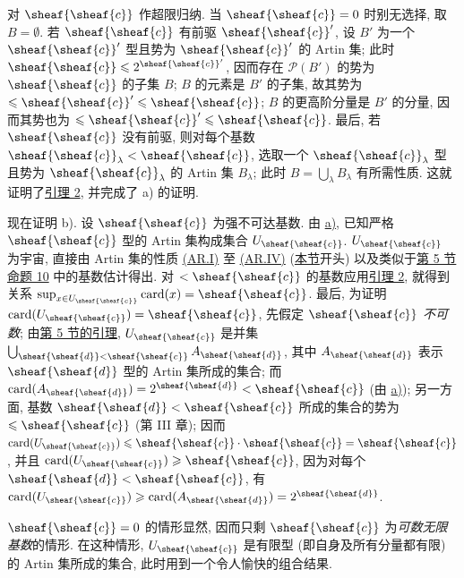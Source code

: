 对 $\sheaf{\sheaf{c}}$ 作超限归纳. 当 $\sheaf{\sheaf{c}}=0$ 时别无选择, 取 $B=∅$. 若 $\sheaf{\sheaf{c}}$ 有前驱 $\sheaf{\sheaf{c}}'$, 设 $B'$ 为一个 $\sheaf{\sheaf{c}}'$ 型且势为 $\sheaf{\sheaf{c}}'$ 的 Artin 集; 此时 $\sheaf{\sheaf{c}}\leq2^{\sheaf{\sheaf{c}}'}$, 因而存在 $\mathcal{P}(B')$ 的势为 $\sheaf{\sheaf{c}}$ 的子集 $B$; $B$ 的元素是 $B'$ 的子集, 故其势为 $\leq\sheaf{\sheaf{c}}'\leq\sheaf{\sheaf{c}}$; $B$ 的更高阶分量是 $B'$ 的分量, 因而其势也为 $\leq\sheaf{\sheaf{c}}'\leq\sheaf{\sheaf{c}}$. 最后, 若 $\sheaf{\sheaf{c}}$ 没有前驱, 则对每个基数 $\sheaf{\sheaf{c}}_\lambda<\sheaf{\sheaf{c}}$, 选取一个 $\sheaf{\sheaf{c}}_\lambda$ 型且势为 $\sheaf{\sheaf{c}}_\lambda$ 的 Artin 集 $B_\lambda$; 此时 $B=\bigcup_\lambda B_\lambda$ 有所需性质. 这就证明了\hyperlink{sga4.exp.I.appendix.II.sec.6.lemma.2}{引理 2}, 并完成了 a) 的证明.

现在证明 b). 设 $\sheaf{\sheaf{c}}$ 为强不可达基数. 由 \hyperlink{sga4.exp.I.appendix.II.sec.6.theorem.2.part.a}{a)}, 已知严格 $\sheaf{\sheaf{c}}$ 型的 Artin 集构成集合 $U_{\sheaf{\sheaf{c}}}$. $U_{\sheaf{\sheaf{c}}}$ 为宇宙, 直接由 Artin 集的性质 \hyperlink{sga4.exp.I.appendix.II.sec.6.property.AR.I}{(AR.I)} 至 \hyperlink{sga4.exp.I.appendix.II.sec.6.property.AR.IV}{(AR.IV)} (\hyperlink{sga4.exp.I.appendix.II.sec.6}{本节}开头) 以及\pageoriginale 类似于\hyperlink{sga4.exp.I.appendix.II.sec.5}{第 5 节}\hyperlink{sga4.exp.I.appendix.II.sec.5.proposition.10}{命题 10} 中的基数估计得出. 对 $<\sheaf{\sheaf{c}}$ 的基数应用\hyperlink{sga4.exp.I.appendix.II.sec.6.lemma.2}{引理 2}, 就得到关系 $\sup_{x\in U_{\sheaf{\sheaf{c}}}}\card(x)=\sheaf{\sheaf{c}}$. 最后, 为证明 $\card(U_{\sheaf{\sheaf{c}}})=\sheaf{\sheaf{c}}$, 先假定 $\sheaf{\sheaf{c}}$ \emph{不可数}; 由\hyperlink{sga4.exp.I.appendix.II.sec.5.lemma.of.section.5}{第 5 节的引理}, $U_{\sheaf{\sheaf{c}}}$ 是并集 $\bigcup_{\sheaf{\sheaf{d}}<\sheaf{\sheaf{c}}}A_{\sheaf{\sheaf{d}}}$, 其中 $A_{\sheaf{\sheaf{d}}}$ 表示 $\sheaf{\sheaf{d}}$ 型的 Artin 集所成的集合; 而 $\card(A_{\sheaf{\sheaf{d}}})=2^{\sheaf{\sheaf{d}}}<\sheaf{\sheaf{c}}$ (由 \hyperlink{sga4.exp.I.appendix.II.sec.6.theorem.2.part.a}{a)}); 另一方面, 基数 $\sheaf{\sheaf{d}}<\sheaf{\sheaf{c}}$ 所成的集合的势为 $\leq\sheaf{\sheaf{c}}$ (第 III 章); 因而 $\card(U_{\sheaf{\sheaf{c}}})\leq\sheaf{\sheaf{c}}\cdot\sheaf{\sheaf{c}}=\sheaf{\sheaf{c}}$, 并且 $\card(U_{\sheaf{\sheaf{c}}})\geq\sheaf{\sheaf{c}}$, 因为对每个 $\sheaf{\sheaf{d}}<\sheaf{\sheaf{c}}$, 有 $\card(U_{\sheaf{\sheaf{c}}})\geq\card(A_{\sheaf{\sheaf{d}}})=2^{\sheaf{\sheaf{d}}}$.


$\sheaf{\sheaf{c}}=0$ 的情形显然, 因而只剩 $\sheaf{\sheaf{c}}$ 为\emph{可数无限基数}的情形. 在这种情形, $U_{\sheaf{\sheaf{c}}}$ 是有限型 (即自身及所有分量都有限) 的 Artin 集所成的集合, 此时用到一个令人愉快的组合结果.


